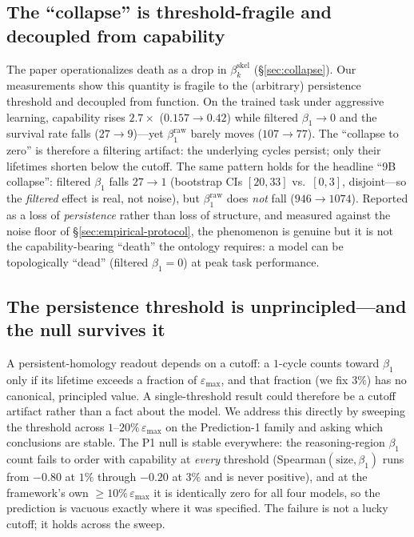 \documentclass{article}
\begin{document}
\subsection{The ``collapse'' is threshold-fragile and decoupled from capability}
\label{sec:empirical-collapse}
The paper operationalizes death as a drop in \(\beta_k^{\text{skel}}\) (\S\ref{sec:collapse}).
Our measurements show this quantity is fragile to the (arbitrary) persistence threshold and
decoupled from function. On the trained task under aggressive learning, capability rises
\(2.7\times\) (\(0.157 \to 0.42\)) while filtered \(\beta_1 \to 0\) and the survival rate falls
(\(27 \to 9\))---yet \(\beta_1^{\text{raw}}\) barely moves (\(107 \to 77\)). The ``collapse to
zero'' is therefore a filtering artifact: the underlying cycles persist; only their lifetimes
shorten below the cutoff. The same pattern holds for the headline ``9B collapse'': filtered
\(\beta_1\) falls \(27 \to 1\) (bootstrap CIs \([20,33]\) vs.\ \([0,3]\), disjoint---so the
\emph{filtered} effect is real, not noise), but \(\beta_1^{\text{raw}}\) does \emph{not} fall
(\(946 \to 1074\)). Reported as a loss of \emph{persistence} rather than loss of structure, and
measured against the noise floor of \S\ref{sec:empirical-protocol}, the phenomenon is genuine
but it is not the capability-bearing ``death'' the ontology requires: a model can be
topologically ``dead'' (filtered \(\beta_1=0\)) at peak task performance.

\subsection{The persistence threshold is unprincipled---and the null survives it}
\label{sec:empirical-threshold}
A persistent-homology readout depends on a cutoff: a $1$-cycle counts toward $\beta_1$ only if its
lifetime exceeds a fraction of $\varepsilon_{\max}$, and that fraction (we fix $3\%$) has no canonical,
principled value. A single-threshold result could therefore be a cutoff artifact rather than a fact
about the model. We address this directly by sweeping the threshold across
$1$--$20\%\,\varepsilon_{\max}$ on the Prediction-1 family and asking which conclusions are stable. The
P1 null is stable everywhere: the reasoning-region $\beta_1$ count fails to order with capability at
\emph{every} threshold (Spearman$(\text{size},\beta_1)$ runs from $-0.80$ at $1\%$ through $-0.20$ at
$3\%$ and is never positive), and at the framework's own $\ge 10\%\,\varepsilon_{\max}$ it is
identically zero for all four models, so the prediction is vacuous exactly where it was specified. The
failure is not a lucky cutoff; it holds across the sweep.
\end{document}
